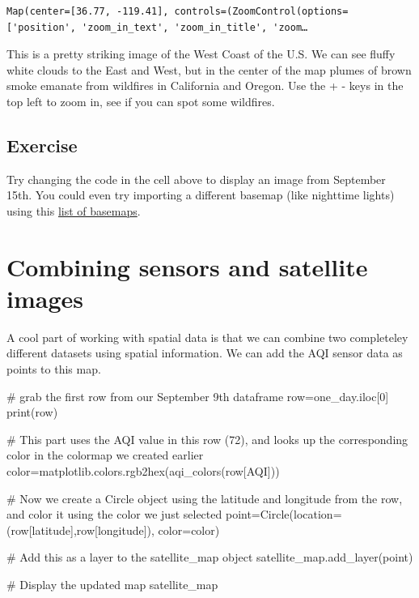 \documentclass[
  letterpaper,
  DIV=11,
  numbers=noendperiod]{scrreprt}
\newenvironment{Shaded}{\begin{snugshade}}{\end{snugshade}}
\newcommand{\BuiltInTok}[1]{\textcolor[rgb]{0.00,0.23,0.31}{#1}}
\newcommand{\CommentTok}[1]{\textcolor[rgb]{0.37,0.37,0.37}{#1}}
\newcommand{\DecValTok}[1]{\textcolor[rgb]{0.68,0.00,0.00}{#1}}
\newcommand{\NormalTok}[1]{\textcolor[rgb]{0.00,0.23,0.31}{#1}}
\newcommand{\OperatorTok}[1]{\textcolor[rgb]{0.37,0.37,0.37}{#1}}
\newcommand{\StringTok}[1]{\textcolor[rgb]{0.13,0.47,0.30}{#1}}
\begin{document}
\begin{verbatim}
Map(center=[36.77, -119.41], controls=(ZoomControl(options=['position', 'zoom_in_text', 'zoom_in_title', 'zoom…
\end{verbatim}

This is a pretty striking image of the West Coast of the U.S. We can see
fluffy white clouds to the East and West, but in the center of the map
plumes of brown smoke emanate from wildfires in California and Oregon.
Use the + - keys in the top left to zoom in, see if you can spot some
wildfires.

\hypertarget{exercise-7}{%
\subsection{Exercise}\label{exercise-7}}

Try changing the code in the cell above to display an image from
September 15th. You could even try importing a different basemap (like
nighttime lights) using this
\href{https://ipyleaflet.readthedocs.io/en/latest/map_and_basemaps/basemaps.html}{list
of basemaps}.

\hypertarget{combining-sensors-and-satellite-images}{%
\section{Combining sensors and satellite
images}\label{combining-sensors-and-satellite-images}}

A cool part of working with spatial data is that we can combine two
completeley different datasets using spatial information. We can add the
AQI sensor data as points to this map.

\begin{Shaded}
\begin{Highlighting}[]
\CommentTok{\# grab the first row from our September 9th dataframe}
\NormalTok{row}\OperatorTok{=}\NormalTok{one\_day.iloc[}\DecValTok{0}\NormalTok{]}
\BuiltInTok{print}\NormalTok{(row)}

\CommentTok{\# This part uses the AQI value in this row (72), and looks up the corresponding color in the colormap we created earlier }
\NormalTok{color}\OperatorTok{=}\NormalTok{matplotlib.colors.rgb2hex(aqi\_colors(row[}\StringTok{\textquotesingle{}AQI\textquotesingle{}}\NormalTok{]))}

\CommentTok{\# Now we create a Circle object using the latitude and longitude from the row, and color it using the color we just selected}
\NormalTok{point}\OperatorTok{=}\NormalTok{Circle(location}\OperatorTok{=}\NormalTok{(row[}\StringTok{\textquotesingle{}latitude\textquotesingle{}}\NormalTok{],row[}\StringTok{\textquotesingle{}longitude\textquotesingle{}}\NormalTok{]), color}\OperatorTok{=}\NormalTok{color)}

\CommentTok{\# Add this as a layer to the satellite\_map object}
\NormalTok{satellite\_map.add\_layer(point)}

\CommentTok{\# Display the updated map}
\NormalTok{satellite\_map}
\end{Highlighting}
\end{Shaded}
\end{document}

